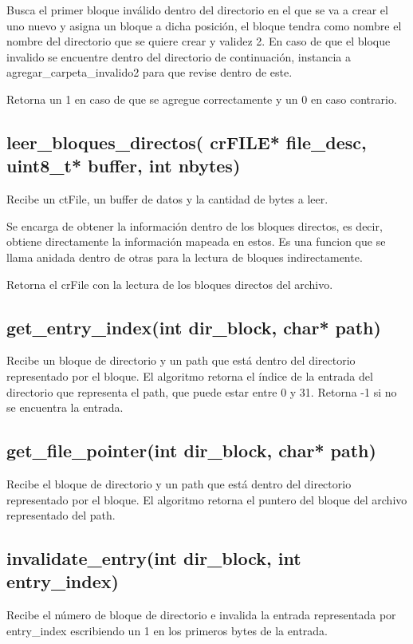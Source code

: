 \documentclass[12pt]{article}
\begin{document}
Busca el primer bloque inválido dentro del directorio en el que se va a crear el uno nuevo y asigna un bloque a dicha posición, el bloque tendra como nombre el nombre del directorio que se quiere crear y validez 2. En caso de que el bloque invalido se encuentre dentro del directorio de continuación, instancia a agregar\_carpeta\_invalido2 para que revise dentro de este.

Retorna un 1 en caso de que se agregue correctamente y un 0 en caso contrario.

\subsection{leer\_bloques\_directos( crFILE* file\_desc, uint8\_t* buffer, int nbytes)}
Recibe un ctFile, un buffer de datos y la cantidad de bytes a leer.

Se encarga de obtener la información dentro de los bloques directos, es decir, obtiene directamente la información mapeada en estos. Es una funcion que se llama anidada dentro de otras para la lectura de bloques indirectamente.

Retorna el crFile con la lectura de los bloques directos del archivo.

\subsection{get\_entry\_index(int dir\_block, char* path)}
Recibe un bloque de directorio y un path que está dentro del directorio representado por el bloque. El algoritmo retorna el índice de la entrada del directorio que representa el path, que puede estar entre 0 y 31. Retorna -1 si no se encuentra la entrada.

\subsection{get\_file\_pointer(int dir\_block, char* path)}
Recibe el bloque de directorio y un path que está dentro del directorio representado por el bloque. 
El algoritmo retorna el puntero del bloque del archivo representado del path.

\subsection{invalidate\_entry(int dir\_block, int entry\_index)}
Recibe el número de bloque de directorio e invalida la entrada representada por entry\_index escribiendo un 1 en los primeros bytes de la entrada.
\end{document}
